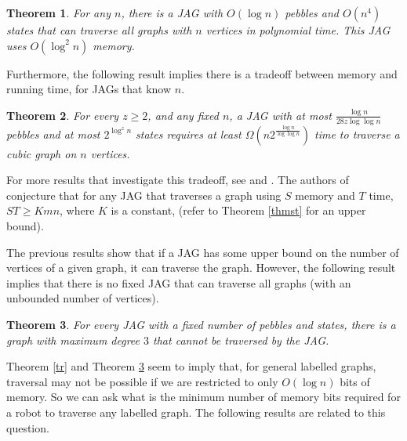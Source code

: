 \documentclass[12pt,letterpaper,oneside]{book}
\newtheorem{theorem}{Theorem}[section]
\begin{document}
\begin{theorem}\label{cr}
For any $n$, there is a JAG with $O(\log n)$ pebbles and $O(n^4)$ states that can traverse all graphs with $n$ vertices in 
polynomial time.  This JAG uses 
$O(\log^2n)$ memory.  
\end{theorem}
 

Furthermore, the following result implies there is a tradeoff between memory and running time, for JAGs that know $n$.  


\begin{theorem}
\emph{\cite{E}} For every $z\ge 2$, and any fixed $n$, a JAG with at 
most $\frac{\log n}{28z\log \log n}$ pebbles and at most $2^{\log^z n}$ states requires 
at least $\Omega(n 2^\frac{\log n}{\log \log n})$ time to traverse a cubic graph on $n$ vertices.  
\end{theorem}

For more results that investigate 
this tradeoff, see \cite{BBRRT} and \cite{BKRU}.  
The authors of \cite{BBRRT} conjecture that for any JAG that traverses a graph using $S$ memory 
and $T$ time, $ST\ge K mn$, where $K$ is a constant, (refer to Theorem \ref{thmst} for an upper bound). 


The previous results show that if a JAG has some upper bound on the number of vertices of a given graph, it can traverse the 
graph.  
However, the following result implies that there is no fixed 
JAG that can traverse all graphs (with an unbounded number of vertices). 





\begin{theorem}\label{jag}
\emph{\cite{CR}} For every JAG with a fixed number of pebbles and states, 
there is a graph with maximum degree $3$ that cannot be traversed by the JAG.  
\end{theorem}

Theorem \ref{tr} and Theorem \ref{jag} seem to imply that, for general labelled graphs, traversal may not be possible if we are restricted to only 
$O(\log n)$ bits of memory.  So we can ask what is the minimum number of memory bits required for a robot to traverse 
any labelled graph.  The following results are related to this question.  
\end{document}
